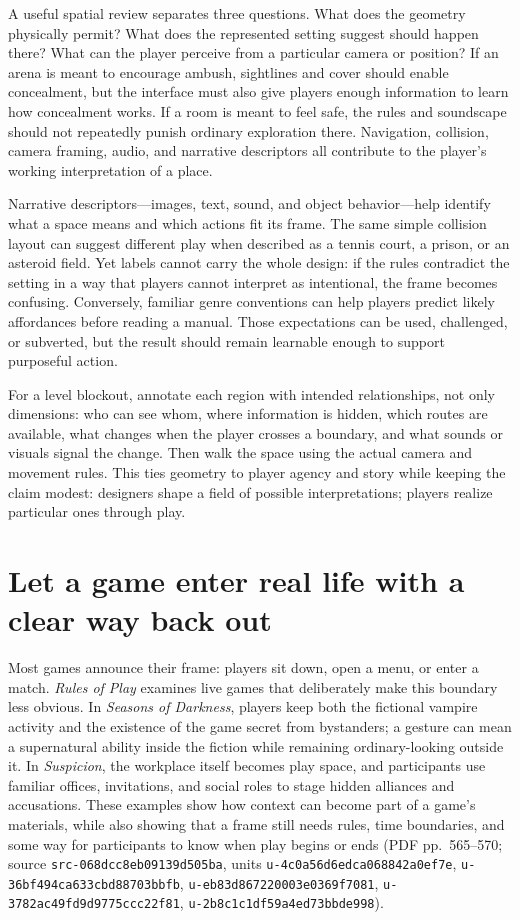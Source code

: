 A useful spatial review separates three questions. What does the geometry physically permit? What does the represented setting suggest should happen there? What can the player perceive from a particular camera or position? If an arena is meant to encourage ambush, sightlines and cover should enable concealment, but the interface must also give players enough information to learn how concealment works. If a room is meant to feel safe, the rules and soundscape should not repeatedly punish ordinary exploration there. Navigation, collision, camera framing, audio, and narrative descriptors all contribute to the player's working interpretation of a place.

Narrative descriptors---images, text, sound, and object behavior---help identify what a space means and which actions fit its frame. The same simple collision layout can suggest different play when described as a tennis court, a prison, or an asteroid field. Yet labels cannot carry the whole design: if the rules contradict the setting in a way that players cannot interpret as intentional, the frame becomes confusing. Conversely, familiar genre conventions can help players predict likely affordances before reading a manual. Those expectations can be used, challenged, or subverted, but the result should remain learnable enough to support purposeful action.

For a level blockout, annotate each region with intended relationships, not only dimensions: who can see whom, where information is hidden, which routes are available, what changes when the player crosses a boundary, and what sounds or visuals signal the change. Then walk the space using the actual camera and movement rules. This ties geometry to player agency and story while keeping the claim modest: designers shape a field of possible interpretations; players realize particular ones through play.

\section{Let a game enter real life with a clear way back out}\label{06-engine-ii-ch047-let-a-game-enter-real-life-with-a-clear-way-back-out}

Most games announce their frame: players sit down, open a menu, or enter a match. \emph{Rules of Play} examines live games that deliberately make this boundary less obvious. In \emph{Seasons of Darkness}, players keep both the fictional vampire activity and the existence of the game secret from bystanders; a gesture can mean a supernatural ability inside the fiction while remaining ordinary-looking outside it. In \emph{Suspicion}, the workplace itself becomes play space, and participants use familiar offices, invitations, and social roles to stage hidden alliances and accusations. These examples show how context can become part of a game's materials, while also showing that a frame still needs rules, time boundaries, and some way for participants to know when play begins or ends (PDF pp.~565--570; source \texttt{src-068dcc8eb09139d505ba}, units \texttt{u-4c0a56d6edca068842a0ef7e}, \texttt{u-36bf494ca633cbd88703bbfb}, \texttt{u-eb83d867220003e0369f7081}, \texttt{u-3782ac49fd9d9775ccc22f81}, \texttt{u-2b8c1c1df59a4ed73bbde998}).

